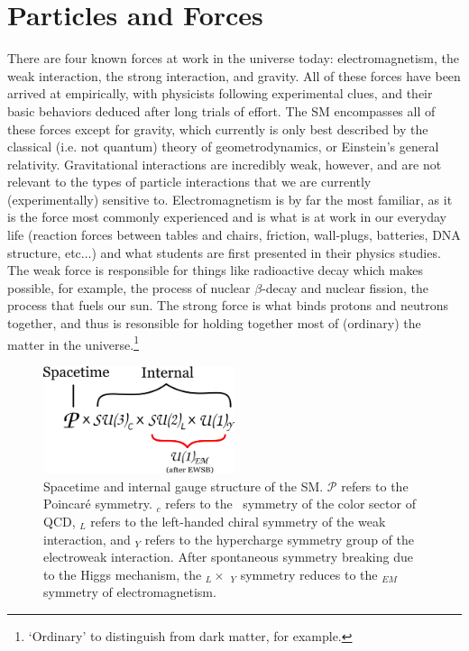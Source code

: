 \section{Particles and Forces}
\label{sec:sm_description}

There are four known forces at work in the universe today: electromagnetism,
the weak interaction, the strong interaction, and gravity.
All of these forces have been arrived at empirically, with physicists following experimental
clues, and their basic behaviors deduced after long trials of effort.
The SM encompasses all of these forces except for gravity, which currently
is only best described by the classical (i.e. not quantum) theory of geometrodynamics, or Einstein's general
relativity. Gravitational interactions are incredibly weak, however, and
are not relevant to the types of particle interactions that we are currently (experimentally)
sensitive to. Electromagnetism is by far the most familiar, as it is the force
most commonly experienced and is what is at work in our everyday life (reaction forces between
tables and chairs, friction, wall-plugs, batteries, DNA structure, etc...) and what students are first presented
in their physics studies. The weak force is responsible for things like radioactive decay
which makes possible, for example, the process of nuclear $\beta$-decay and nuclear
fission, the process that fuels our sun. The strong force is what binds protons
and neutrons together, and thus is resonsible for holding together most of (ordinary) the matter
in the universe.\footnote{`Ordinary' to distinguish from dark matter, for example.}





\begin{figure}[!htb]
	\begin{center}
		\includegraphics[width=0.5\textwidth]{figures/chapter1/sm_forces}
		\caption{
			Spacetime and internal gauge structure of the SM.
			$\mathcal{P}$ refers to the Poincar{\'e} symmetry.
			\SUthree$_c$ refers to the \SUthree~symmetry
			of the color sector of QCD, \SUtwo$_{L}$ refers to the left-handed chiral
			symmetry of the weak interaction, and \Uone$_{Y}$ refers to the hypercharge
			symmetry group of the electroweak interaction. After spontaneous symmetry
			breaking due to the Higgs mechanism, the \SUtwo$_L \times$ \Uone$_Y$ symmetry
			reduces to the \Uone$_{EM}$ symmetry of electromagnetism.
		}
	\end{center}
	\label{fig:sm_forces}
\end{figure}
